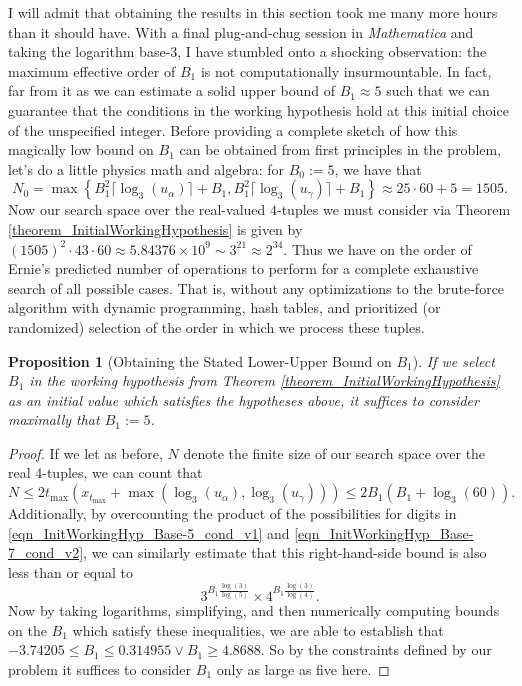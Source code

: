 \documentclass[12pt]{article}
\newtheorem{prop}[theorem]{Proposition}
\begin{document}
I will admit that obtaining the results in this section took me many more hours than it should have. 
With a final plug-and-chug session in \emph{Mathematica} and taking the logarithm base-$3$, I have 
stumbled onto a shocking observation: the maximum effective order of $B_1$ is not computationally 
insurmountable. In fact, far from it as we can estimate a solid upper bound of $B_1 \approx 5$ such that 
we can guarantee that the conditions in the working hypothesis hold at this initial choice of the 
unspecified integer. Before providing a complete sketch of how this magically low bound on $B_1$ can be 
obtained from first principles in the problem, let's do a little physics math and algebra: 
for $B_0 := 5$, we have that 
$$N_0 = \max\left\{B_1^2 \lceil \log_3(u_{\alpha})\rceil+B_1, 
     B_1^2 \lceil \log_3(u_{\gamma})\rceil+B_1\right\} \approx 25 \cdot 60+5 = 1505.$$ 
Now our search space over the real-valued $4$-tuples we must consider via 
Theorem \ref{theorem_InitialWorkingHypothesis} is given by 
$(1505)^2 \cdot 43 \cdot 60 \approx 5.84376 \times 10^{9} \sim 3^{21} \approx 2^{34}$. 
Thus we have on the order of 
Ernie's predicted number of operations to perform for a complete exhaustive search of all possible 
cases. That is, without any optimizations to the brute-force algorithm with dynamic programming, 
hash tables, and prioritized (or randomized) selection of the order in which we process these tuples. 

\begin{prop}[Obtaining the Stated Lower-Upper Bound on $B_1$] 
If we select $B_1$ in the working hypothesis from Theorem \ref{theorem_InitialWorkingHypothesis} 
as an initial value which 
satisfies the hypotheses above, it suffices to consider maximally that $B_1 := 5$. 
\end{prop} 
\begin{proof} 
If we let as before, $N$ denote the finite size of our search space over the real $4$-tuples, we can 
count that 
$$N \leq 2 t_{\max} (x_{t_{\max}} + \max(\log_3(u_{\alpha}), \log_3(u_{\gamma}))) \leq 
     2 B_1(B_1 + \log_3(60)).$$ 
Additionally, by overcounting the product of the possibilities for digits in 
\eqref{eqn_InitWorkingHyp_Base-5_cond_v1} and \eqref{eqn_InitWorkingHyp_Base-7_cond_v2}, 
we can similarly estimate that this right-hand-side bound is also less than or 
equal to $$3^{B_1 \frac{\log(3)}{\log(5)}} \times 4^{B_1 \frac{\log(3)}{\log(4)}}.$$ 
Now by taking logarithms, simplifying, and then numerically computing bounds on the $B_1$ which 
satisfy these inequalities, we are able to establish that 
$-3.74205 \leq B_1 \leq 0.314955 \vee B_1 \geq 4.8688$. So by the constraints defined by our problem it 
suffices to consider $B_1$ only as large as five here. 
\end{proof} 
\end{document}

